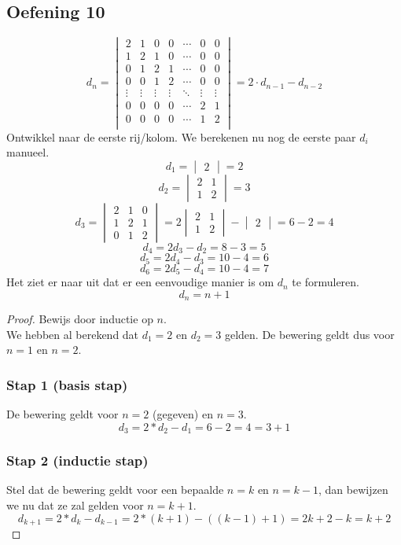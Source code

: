 \documentclass[lineaire_algebra_oplossingen.tex]{subfiles}
\begin{document}
\subsection{Oefening 10}
\[
d_n =
\begin{vmatrix}
2 & 1 & 0 & 0 & \cdots & 0 & 0 \\
1 & 2 & 1 & 0 & \cdots & 0 & 0 \\
0 & 1 & 2 & 1 & \cdots & 0 & 0 \\
0 & 0 & 1 & 2 & \cdots & 0 & 0 \\
\vdots & \vdots & \vdots & \vdots & \ddots & \vdots & \vdots\\
0 & 0 & 0 & 0 & \cdots & 2 & 1 \\
0 & 0 & 0 & 0 & \cdots & 1 & 2 \\
\end{vmatrix}
=
2 \cdot d_{n-1} - d_{n-2}
\]
Ontwikkel naar de eerste rij/kolom.
We berekenen nu nog de eerste paar $d_i$ manueel.
\[
d_1
=
\begin{vmatrix}
2
\end{vmatrix} = 2
\]
\[
d_2
=
\begin{vmatrix}
2 & 1\\
1 & 2
\end{vmatrix} = 3
\]
\[
d_3
=
\begin{vmatrix}
2 & 1 & 0\\
1 & 2 & 1\\
0 & 1 & 2
\end{vmatrix}
= 2 
\begin{vmatrix}
2 & 1\\
1 & 2
\end{vmatrix}
-
\begin{vmatrix}
2
\end{vmatrix}
=
6 - 2 = 4
\]
\[
d_4 = 2 d_3 - d_2 = 8 - 3 = 5
\]
\[
d_5 = 2 d_4 - d_3 = 10-4 = 6
\]
\[
d_6 = 2 d_5 - d_4 = 10-4 = 7
\]
Het ziet er naar uit dat er een eenvoudige manier is om $d_n$ te formuleren.
\[
d_n = n+1
\]
\begin{proof}
Bewijs door inductie op $n$.\\
We hebben al berekend dat $d_1 = 2$ en $d_2 =3$ gelden. De bewering geldt dus voor $n=1$ en $n=2$.
\subsubsection*{Stap 1 (basis stap)}
De bewering geldt voor $n=2$ (gegeven) en $n=3$.
\[
d_3 = 2*d_2 - d_1 = 6 - 2 = 4 = 3+1
\]
\subsubsection*{Stap 2 (inductie stap)}
Stel dat de bewering geldt voor een bepaalde $n=k$ en $n=k-1$, dan bewijzen we nu dat ze zal gelden voor $n=k+1$.
\[
d_{k+1} = 2* d_{k} - d_{k-1} = 2*(k+1) - ((k-1)+1) = 2k+2-k = k+2
\]
\end{proof}
\end{document}
